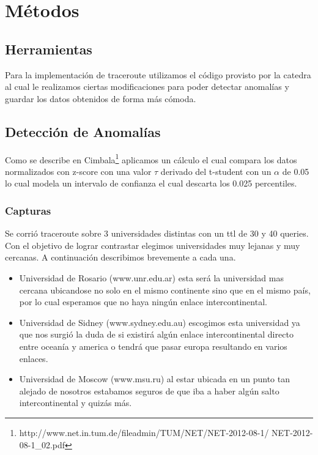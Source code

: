 \section{Métodos}

\subsection*{Herramientas}
Para la implementación de traceroute utilizamos el código provisto por la catedra al cual le realizamos ciertas modificaciones para poder detectar anomalías y guardar los datos obtenidos de forma más cómoda.

\subsection*{Detección de Anomalías}

Como se describe en Cimbala\footnote{http://www.net.in.tum.de/fileadmin/TUM/NET/NET-2012-08-1/
NET-2012-08-1\_02.pdf} aplicamos un cálculo el cual compara los datos normalizados con z-score con una valor $\tau$ derivado del t-student con un $\alpha$ de 0.05 lo cual modela un intervalo de confianza el cual descarta los 0.025 percentiles.


\subsubsection*{Capturas}
Se corrió traceroute sobre 3 universidades distintas con un ttl de 30 y 40 queries. Con el objetivo de lograr contrastar elegimos universidades muy lejanas y muy cercanas. A continuación describimos brevemente a cada una.

\begin{itemize}
	\item Universidad de Rosario (www.unr.edu.ar) esta será la universidad mas cercana ubicandose no solo en el mismo continente sino que en el mismo país, por lo cual esperamos que no haya ningún enlace intercontinental.
	\item Universidad de Sidney (www.sydney.edu.au) escogimos esta universidad ya que nos surgió la duda de si existirá algún enlace intercontinental directo entre oceanía y america o tendrá que pasar europa resultando en varios enlaces.
	\item Universidad de Moscow (www.msu.ru) al estar ubicada en un punto tan alejado de nosotros estabamos seguros de que iba a haber algún salto intercontinental y quizás más.
\end{itemize}